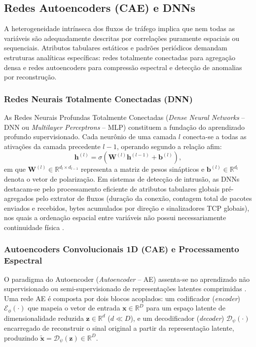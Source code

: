 \subsection{Redes Autoencoders (CAE) e DNNs}
\label{subsec:cae_dnns}

A heterogeneidade intrínseca dos fluxos de tráfego implica que nem todas as variáveis são adequadamente descritas por correlações puramente espaciais ou sequenciais. Atributos tabulares estáticos e padrões periódicos demandam estruturas analíticas específicas: redes totalmente conectadas para agregação densa e redes autoencoders para compressão espectral e detecção de anomalias por reconstrução.

\subsubsection{Redes Neurais Totalmente Conectadas (DNN)}

As Redes Neurais Profundas Totalmente Conectadas (\emph{Dense Neural Networks} -- DNN ou \emph{Multilayer Perceptrons} -- MLP) constituem a fundação do aprendizado profundo supervisionado. Cada neurônio de uma camada $l$ conecta-se a todas as ativações da camada precedente $l-1$, operando segundo a relação afim:
\begin{equation}
\label{eq:dnn_dense}
\mathbf{h}^{(l)} = \sigma \left( \mathbf{W}^{(l)} \mathbf{h}^{(l-1)} + \mathbf{b}^{(l)} \right),
\end{equation}
em que $\mathbf{W}^{(l)} \in \mathbb{R}^{d_l \times d_{l-1}}$ representa a matriz de pesos sinápticos e $\mathbf{b}^{(l)} \in \mathbb{R}^{d_l}$ denota o vetor de polarização. Em sistemas de detecção de intrusão, as DNNs destacam-se pelo processamento eficiente de atributos tabulares globais pré-agregados pelo extrator de fluxos (duração da conexão, contagem total de pacotes enviados e recebidos, bytes acumulados por direção e sinalizadores TCP globais), nos quais a ordenação espacial entre variáveis não possui necessariamente continuidade física \cite{advancedids2024}.

\subsubsection{Autoencoders Convolucionais 1D (CAE) e Processamento Espectral}

O paradigma do Autoencoder (\emph{Autoencoder} -- AE) assenta-se no aprendizado não supervisionado ou semi-supervisionado de representações latentes comprimidas \cite{hsae2025}. Uma rede AE é composta por dois blocos acoplados: um codificador (\emph{encoder}) $\mathcal{E}_{\phi}(\cdot)$ que mapeia o vetor de entrada $\mathbf{x} \in \mathbb{R}^D$ para um espaço latente de dimensionalidade reduzida $\mathbf{z} \in \mathbb{R}^d$ ($d \ll D$), e um decodificador (\emph{decoder}) $\mathcal{D}_{\psi}(\cdot)$ encarregado de reconstruir o sinal original a partir da representação latente, produzindo $\tilde{\mathbf{x}} = \mathcal{D}_{\psi}(\mathbf{z}) \in \mathbb{R}^D$.

